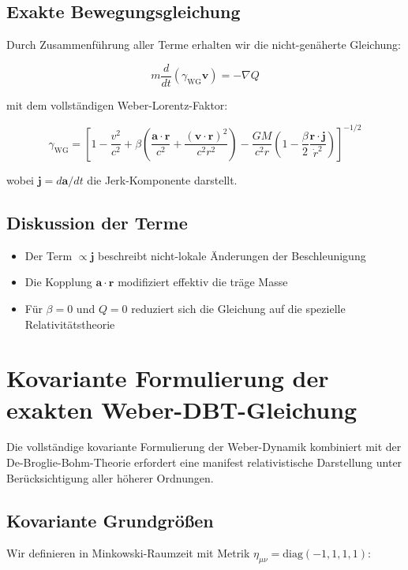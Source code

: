 \subsection{Exakte Bewegungsgleichung}
Durch Zusammenführung aller Terme erhalten wir die nicht-genäherte Gleichung:

\begin{equation}
\boxed{
m\frac{d}{dt}\left(\gamma_{\text{WG}}\mathbf{v}\right) = -\nabla Q
}
\end{equation}

mit dem vollständigen Weber-Lorentz-Faktor:

\begin{equation}
\gamma_{\text{WG}} = \left[1 - \frac{v^2}{c^2} + \beta\left(\frac{\mathbf{a}\cdot\mathbf{r}}{c^2} + \frac{(\mathbf{v}\cdot\mathbf{r})^2}{c^2r^2}\right) - \frac{GM}{c^2r}\left(1 - \frac{\beta}{2}\frac{\mathbf{r}\cdot\mathbf{j}}{\dot{r}^2}\right)\right]^{-1/2}
\end{equation}

wobei $\mathbf{j} = d\mathbf{a}/dt$ die Jerk-Komponente darstellt.

\subsection{Diskussion der Terme}
\begin{itemize}
\item Der Term $\propto \mathbf{j}$ beschreibt nicht-lokale Änderungen der Beschleunigung
\item Die Kopplung $\mathbf{a}\cdot\mathbf{r}$ modifiziert effektiv die träge Masse
\item Für $\beta=0$ und $Q=0$ reduziert sich die Gleichung auf die spezielle Relativitätstheorie
\end{itemize}

\section{Kovariante Formulierung der exakten Weber-DBT-Gleichung}
\label{sec:covariant_formulation}

Die vollständige kovariante Formulierung der Weber-Dynamik kombiniert mit der De-Broglie-Bohm-Theorie erfordert eine manifest relativistische Darstellung unter Berücksichtigung aller höherer Ordnungen.

\subsection{Kovariante Grundgrößen}
Wir definieren in Minkowski-Raumzeit mit Metrik $\eta_{\mu\nu} = \mathrm{diag}(-1,1,1,1)$:

